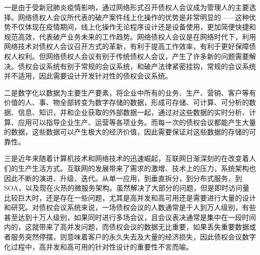 一是由于受新冠肺炎疫情影响，通过网络形式召开债权人会议成为管理人的主要选择。网络债权人会议所代表的破产案件线上化操作的优势是非常明显的——这种优势不仅体现在疫情期间，线上化操作无论程序设计还是设备使用，更加简便快捷和规范高效，代表破产业务未来的工作趋势。网络债权人会议是在网络时代下，利用网络技术对债权人会议召开方式的革新，有利于提高工作效率，有利于更好保障债权人权利。但网络债权人会议有别于传统债权人会议，产生了许多新的问题需要解决。债权会议系统有别于常规的会议系统，和破产法律紧密挂钩，常规的会议系统并不适用，因此需要设计开发针对性的债权会议系统。

二是数字化以数据为主要生产要素，将企业中所有的业务、生产、营销、客户等有价值的人、事、物全部转变为数字存储的数据，形成可存储、可计算、可分析的数据、信息、知识，并和企业获取的外部数据一起，通过对这些数据的实时分析、计算、应用可以指导企业生产、运营等各项业务。而每一次的债权会议都能产生大量的数据，这些数据可以产生极大的经济价值，因此需要保证对这些数据的存储的可靠性。

三是近年来随着计算机技术和网络技术的迅速崛起，互联网日渐深刻的在改变着人们的生产生活方式。互联网的发展带来了需求的激增、技术上的压力，系统架构也因此不断的演进、升级、迭代。从单一应用，到垂直拆分，到分布式服务，到 SOA，以及现在火热的微服务架构。虽然解决了大部分的问题，但是即时访问量比较巨大时，还是存在一些问题，尤其是高并发和高可用还是需要进行大量的设计和研究。对债权会议系统来说，一场债权会议的人数通常是千人到万人级别，有些甚至达到十万人级别，如果同时进行多场会议，且会议表决通常是集中在一段时间内的，这就带来了高并发问题，而债权会议的数据无比重要，如果丢失重要数据或者服务突然停摆，则意味着客户的永久失去及大量的经济损失，因此债权会议数字化过程中，高并发和高可用的针对性设计的重要性不言而喻。




